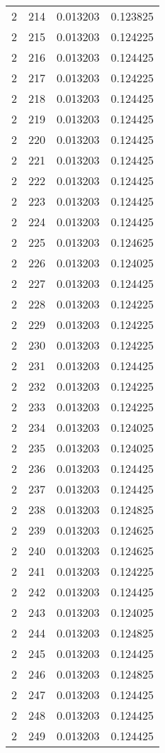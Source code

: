 \begin{longtable}{rrrr}
2 & 214 & 0.013203 & 0.123825 \\
2 & 215 & 0.013203 & 0.124225 \\
2 & 216 & 0.013203 & 0.124425 \\
2 & 217 & 0.013203 & 0.124225 \\
2 & 218 & 0.013203 & 0.124425 \\
2 & 219 & 0.013203 & 0.124425 \\
2 & 220 & 0.013203 & 0.124425 \\
2 & 221 & 0.013203 & 0.124425 \\
2 & 222 & 0.013203 & 0.124425 \\
2 & 223 & 0.013203 & 0.124425 \\
2 & 224 & 0.013203 & 0.124425 \\
2 & 225 & 0.013203 & 0.124625 \\
2 & 226 & 0.013203 & 0.124025 \\
2 & 227 & 0.013203 & 0.124425 \\
2 & 228 & 0.013203 & 0.124225 \\
2 & 229 & 0.013203 & 0.124225 \\
2 & 230 & 0.013203 & 0.124225 \\
2 & 231 & 0.013203 & 0.124425 \\
2 & 232 & 0.013203 & 0.124225 \\
2 & 233 & 0.013203 & 0.124225 \\
2 & 234 & 0.013203 & 0.124025 \\
2 & 235 & 0.013203 & 0.124025 \\
2 & 236 & 0.013203 & 0.124425 \\
2 & 237 & 0.013203 & 0.124425 \\
2 & 238 & 0.013203 & 0.124825 \\
2 & 239 & 0.013203 & 0.124625 \\
2 & 240 & 0.013203 & 0.124625 \\
2 & 241 & 0.013203 & 0.124225 \\
2 & 242 & 0.013203 & 0.124425 \\
2 & 243 & 0.013203 & 0.124025 \\
2 & 244 & 0.013203 & 0.124825 \\
2 & 245 & 0.013203 & 0.124425 \\
2 & 246 & 0.013203 & 0.124825 \\
2 & 247 & 0.013203 & 0.124425 \\
2 & 248 & 0.013203 & 0.124425 \\
2 & 249 & 0.013203 & 0.124425 \\

\end{longtable}
